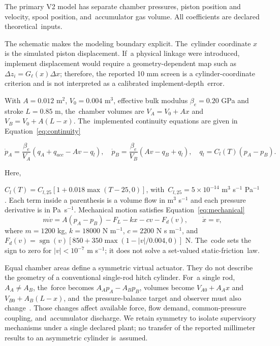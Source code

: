 \documentclass[machines,article,submit,pdftex,moreauthors]{Definitions/mdpi}
\begin{document}
The primary V2 model has separate chamber pressures, piston position and velocity, spool position, and~accumulator gas volume. All coefficients are declared theoretical~inputs.



The schematic makes the modeling boundary explicit. The~cylinder coordinate $x$ is the simulated piston displacement. If~a physical linkage were introduced, implement displacement would require a geometry-dependent map such as $\Delta z_i=G_\ell(x)\Delta x$; therefore, the reported 10 mm screen is a cylinder-coordinate criterion and is not interpreted as a calibrated implement-depth~error.

With $A=0.012$ m$^2$, $V_0=0.004$ m$^3$, effective bulk modulus $\beta_e=0.20$ GPa and stroke $L=0.85$ m, the~chamber volumes are $V_A=V_0+Ax$ and $V_B=V_0+A(L-x)$. The~implemented continuity equations are given in Equation~\eqref{eq:continuity}

\begin{equation}
\dot p_A=\frac{\beta_e}{V_A}(q_A+q_{acc}-Av-q_l),\quad
\dot p_B=\frac{\beta_e}{V_B}(Av-q_B+q_l),\quad
q_l=C_l(T)(p_A-p_B).
\label{eq:continuity}
\end{equation}

Here,

 $C_l(T)=C_{l,25}[1+0.018\max(T-25,0)]$, with~$C_{l,25}=5\times10^{-14}$ m$^3$ s$^{-1}$ Pa$^{-1}$. Each term inside a parenthesis is a volume flow in m$^3$ s$^{-1}$ and each pressure derivative is in \mbox{Pa s$^{-1}$}. Mechanical motion satisfies Equation~\eqref{eq:mechanical}
\begin{equation}
m\dot v=A(p_A-p_B)-F_L-kx-cv-F_d(v),\qquad \dot x=v,
\label{eq:mechanical}
\end{equation}
where $m=1200$ kg, $k=18000$ N m$^{-1}$, $c=2200$ N s m$^{-1}$, and~$F_d(v)=\operatorname{sgn}(v)[850+350\max(1-|v|/0.004,0)]$ N. The~code sets the sign to zero for $|v|<10^{-7}$ m s$^{-1}$; it does not solve a set-valued static-friction~law.

Equal chamber areas define a symmetric virtual actuator. They do not describe the geometry of a conventional single-rod hitch cylinder. For~a single rod, $A_A\ne A_B$, the~force becomes $A_Ap_A-A_Bp_B$, volumes become $V_{A0}+A_Ax$ and $V_{B0}+A_B(L-x)$, and~the pressure-balance target and observer must also change~\cite{yao2000,ketelsen2019}. Those changes affect available force, flow demand, common-pressure coupling, and~accumulator discharge. We retain symmetry to isolate supervisory mechanisms under a single declared plant; no transfer of the reported millimeter results to an asymmetric cylinder is~assumed.
\end{document}
